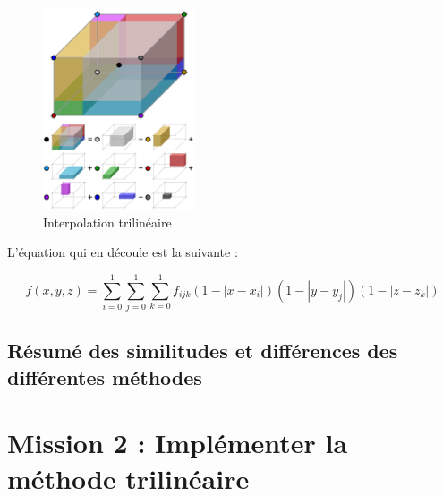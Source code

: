 \begin{figure}[ht!]
    \centering
    \includegraphics[width=0.4\textwidth]{images/Trilinear_interpolation_visualisation.svg.png}
    \caption{Interpolation trilinéaire} %
\end{figure}

L'équation qui en découle est la suivante :

\begin{equation}
    f(x, y, z) = \sum_{i=0}^{1} \sum_{j=0}^{1} \sum_{k=0}^{1} f_{ijk} (1 - |x - x_i|)(1 - |y - y_j|)(1 - |z - z_k|)
\end{equation}



\subsection{Résumé des similitudes et différences des différentes méthodes}



\section{Mission 2 : Implémenter la méthode trilinéaire}
